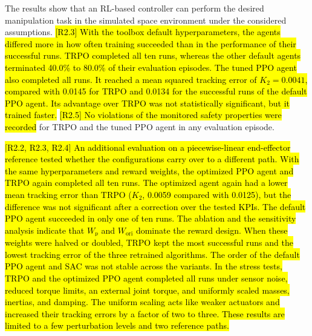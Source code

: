 \documentclass{ieeeaccess}
\newcommand{\hlone}[1]{{\sethlcolor{rone}\hl{#1}}}
\begin{document}
The results show that an RL-based controller can perform the desired manipulation task in
the simulated space environment under the considered assumptions. \hlone{[R2.3] With the
toolbox default hyperparameters, the agents differed more in how often training succeeded than in the
performance of their successful runs. TRPO completed all ten runs, whereas the other default agents
terminated 40.0\% to 80.0\% of their evaluation episodes. The tuned PPO agent also completed all runs. It
reached a mean squared tracking error of $K_2 = 0.0041$, compared with 0.0145 for TRPO and 0.0134 for the
successful runs of the default PPO agent. Its advantage over TRPO was not statistically significant, but
it trained faster.} \hlone{[R2.5] No violations of the monitored safety properties were recorded} for
TRPO and the tuned PPO agent in any evaluation episode.

\hlone{[R2.2, R2.3, R2.4] An additional evaluation on a piecewise-linear end-effector
reference tested whether the configurations carry over to a different path. With the same
hyperparameters and reward weights, the optimized PPO agent and TRPO again completed all ten runs. The
optimized agent again had a lower mean tracking error than TRPO ($K_2$, 0.0059 compared with 0.0125),
but the difference was not significant after a correction over the tested KPIs. The default PPO agent
succeeded in only one of ten runs. The ablation and the sensitivity analysis indicate that $W_p$ and
$W_{\mathrm{ori}}$ dominate the reward design. When these weights were halved or doubled, TRPO kept the
most successful runs and the lowest tracking error of the three retrained algorithms. The order of the
default PPO agent and SAC was not stable across the variants. In the stress tests, TRPO and the
optimized PPO agent completed all runs under sensor noise, reduced torque limits, an external joint
torque, and uniformly scaled masses, inertias, and damping. The uniform scaling acts like weaker
actuators and increased their tracking errors by a factor of two to three. These results are limited to
a few perturbation levels and two reference paths.}
\end{document}
